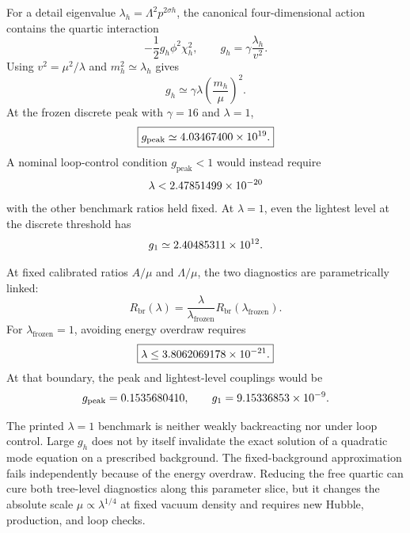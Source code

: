 For a detail eigenvalue $\lambda_h=\Lambda^2p^{2\sigma h}$, the canonical four-dimensional action contains the quartic interaction
\begin{equation}
-\frac12g_h\phi^2\chi_h^2,
\qquad
g_h=\gamma\frac{\lambda_h}{v^2}.
\label{eq:back-gh}
\end{equation}
Using $v^2=\mu^2/\lambda$ and $m_h^2\simeq\lambda_h$ gives
\begin{equation}
g_h\simeq\gamma\lambda\left(\frac{m_h}{\mu}\right)^2.
\label{eq:back-gh-scaled}
\end{equation}
At the frozen discrete peak with $\gamma=16$ and $\lambda=1$,
\begin{equation}
\boxed{g_{\mathrm{peak}}\simeq4.03467400\times 10^{19}.}
\label{eq:back-peak-coupling}
\end{equation}
A nominal loop-control condition $g_{\mathrm{peak}}<1$ would instead require
\begin{equation}
\lambda<2.47851499\times 10^{-20}
\label{eq:back-lambda-bound}
\end{equation}
with the other benchmark ratios held fixed.  At $\lambda=1$, even the lightest level at the discrete threshold has
\begin{equation}
g_1\simeq2.40485311\times 10^{12}.
\end{equation}

At fixed calibrated ratios $A/\mu$ and $\Lambda/\mu$, the two diagnostics are parametrically linked:
\begin{equation}
R_{\mathrm{br}}(\lambda)
=\frac{\lambda}{\lambda_{\mathrm{frozen}}}
R_{\mathrm{br}}(\lambda_{\mathrm{frozen}}).
\end{equation}
For $\lambda_{\mathrm{frozen}}=1$, avoiding energy overdraw requires
\begin{equation}
\boxed{\lambda\le3.8062069178\times 10^{-21}.}
\end{equation}
At that boundary, the peak and lightest-level couplings would be
\begin{equation}
g_{\mathrm{peak}}=0.1535680410,
\qquad
g_1=9.15336853\times 10^{-9}.
\end{equation}

\begin{negativebox}
The printed $\lambda=1$ benchmark is neither weakly backreacting nor under loop control.  Large $g_h$ does not by itself invalidate the exact solution of a quadratic mode equation on a prescribed background.  The fixed-background approximation fails independently because of the energy overdraw.  Reducing the free quartic can cure both tree-level diagnostics along this parameter slice, but it changes the absolute scale $\mu\propto\lambda^{1/4}$ at fixed vacuum density and requires new Hubble, production, and loop checks.
\end{negativebox}

